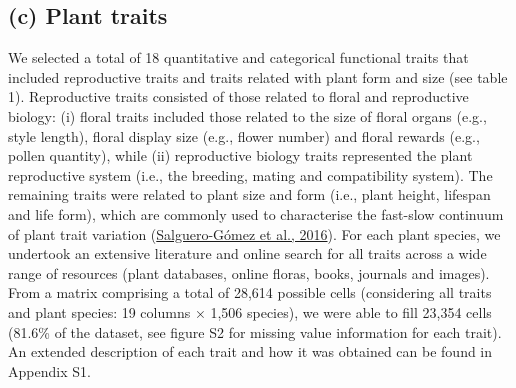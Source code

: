\documentclass[
  12pt,
  a4paper,
]{article}
\begin{document}
\hypertarget{c-plant-traits}{%
\subsection{(c) Plant traits}\label{c-plant-traits}}

We selected a total of 18 quantitative and categorical functional traits that included reproductive traits and traits related with plant form and size (see table 1). Reproductive traits consisted of those related to floral and reproductive biology: (i) floral traits included those related to the size of floral organs (e.g., style length), floral display size (e.g., flower number) and floral rewards (e.g., pollen quantity), while (ii) reproductive biology traits represented the plant reproductive system (i.e., the breeding, mating and compatibility system). The remaining traits were related to plant size and form (i.e., plant height, lifespan and life form), which are commonly used to characterise the fast-slow continuum of plant trait variation (\protect\hyperlink{ref-salguero2016}{Salguero-Gómez et al., 2016}). For each plant species, we undertook an extensive literature and online search for all traits across a wide range of resources (plant databases, online floras, books, journals and images). From a matrix comprising a total of 28,614 possible cells (considering all traits and plant species: 19 columns × 1,506 species), we were able to fill 23,354 cells (81.6\% of the dataset, see figure S2 for missing value information for each trait). An extended description of each trait and how it was obtained can be found in Appendix S1.

\singlespacing
\end{document}
